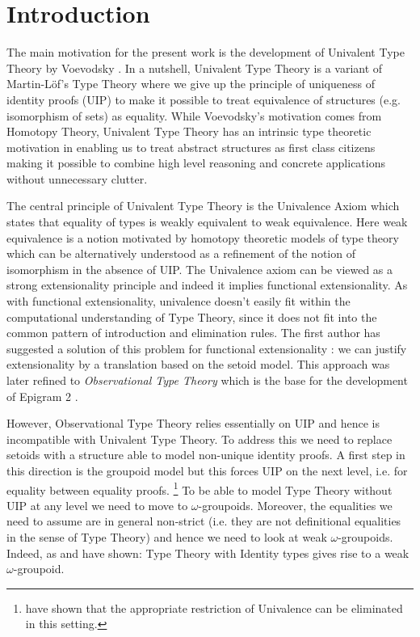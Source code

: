 \section{Introduction}

The main motivation for the present work is the development of
Univalent Type Theory by Voevodsky \cite{voevodsky}. In a
nutshell, Univalent Type Theory is a variant of Martin-L\"of's Type
Theory where we give up the principle of uniqueness of identity proofs
(UIP) to make it possible to treat equivalence of structures
(e.g. isomorphism of sets) as equality. While Voevodsky's motivation
comes from Homotopy Theory, Univalent Type Theory has an intrinsic
type theoretic motivation in enabling us to treat abstract structures
as first class citizens making it possible to combine high level
reasoning and concrete applications without unnecessary clutter. 

The central principle of Univalent Type Theory is the Univalence Axiom
which states that equality of types is weakly equivalent to weak
equivalence. Here weak equivalence is a notion motivated by homotopy
theoretic models of type theory which can be alternatively understood
as a refinement of the notion of isomorphism in the absence of
UIP. The Univalence axiom can be viewed as a strong extensionality
principle and indeed it implies functional extensionality. As with
functional extensionality, univalence doesn't easily fit within the
computational understanding of Type Theory, since it does not fit into
the common pattern of introduction and elimination rules. The first
author has suggested a solution of this problem for functional
extensionality \cite{altenkirch99:extensional-equality}: we can justify extensionality by a
translation based on the setoid model. This approach was later refined
\cite{altenkirch07:observational-equality} to \emph{Observational Type Theory} which is the base
for the development of Epigram 2 \cite{epigram2}.

However, Observational Type Theory relies essentially on UIP and hence
is incompatible with Univalent Type Theory. To address this we need to
replace setoids with a structure able to model non-unique identity
proofs. A first step in this direction is the groupoid model
\cite{hofmann98:the-groupoid-interpretation} but this forces UIP on the next level, i.e. for
equality between equality proofs. 
\footnote{\cite{licata:2011} have shown that the appropriate
  restriction of Univalence can be eliminated in this setting.}
To be able to model Type Theory
without UIP at any level we need to move to
$\omega$-groupoids. Moreover, the equalities we need to assume are in
general non-strict (i.e. they are not definitional equalities in the
sense of Type Theory) and hence we need to look at weak
$\omega$-groupoids. Indeed, as \cite{berg08:types-are} and \cite{lumsdaine10:weak-o-categories} have
shown: Type Theory with Identity types gives rise to a weak
$\omega$-groupoid. 

